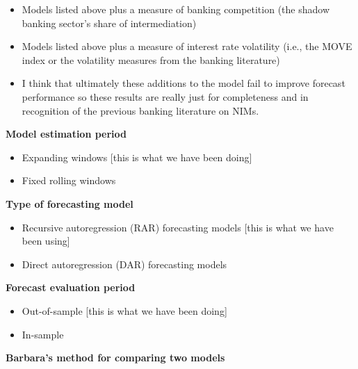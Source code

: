 \documentclass[11pt]{article}
\begin{document}
\begin{itemize}
\item Models listed above plus a measure of banking competition (the shadow banking sector's share of intermediation)
\item Models listed above plus a measure of interest rate volatility (i.e., the MOVE index or the volatility measures from the banking literature)
\item I think that ultimately these additions to the model fail to improve forecast performance so these results are really just for completeness and in recognition of the previous banking literature on NIMs.
\end{itemize}

\textbf{Model estimation period}

\begin{itemize}
\item Expanding windows [this is what we have been doing]
\item Fixed rolling windows
\end{itemize}

\textbf{Type of forecasting model}

\begin{itemize}
\item Recursive autoregression (RAR) forecasting models [this is what we have been using]
\item Direct autoregression (DAR) forecasting models
\end{itemize}

\textbf{Forecast evaluation period}

\begin{itemize}
\item Out-of-sample [this is what we have been doing] 
\item In-sample
\end{itemize}

\textbf{Barbara's method for comparing two models}
\end{document}

